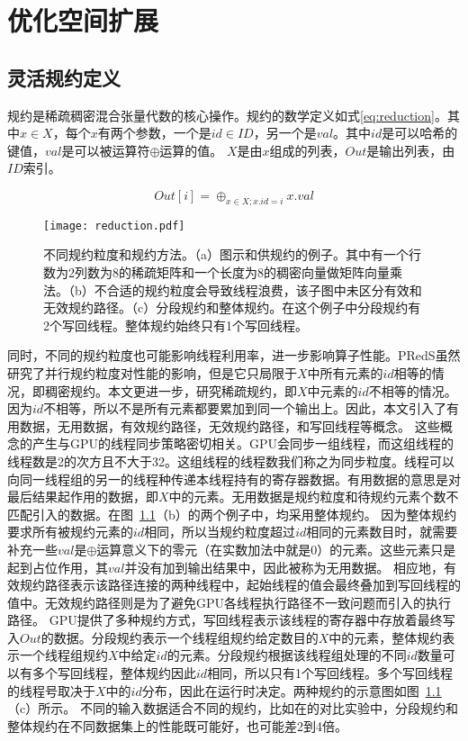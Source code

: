 
\chapter{优化空间扩展}

\section{灵活规约定义}\label{sec:flexible-reduciton}
规约是稀疏稠密混合张量代数的核心操作。规约的数学定义如式\eqref{eq:reduction}。其中$x \in X$，每个$x$有两个参数，一个是$id\in ID$，另一个是$val$。其中$id$是可以哈希的键值，$val$是可以被运算符$\oplus$运算的值。
$X$是由$x$组成的列表，$Out$是输出列表，由$ID$索引。

\begin{equation}
  Out[i] = \oplus_{x\in X;x.id=i} x.val
  \label{eq:reduction}
\end{equation}
\begin{figure}[h]%
  \centering
  \texttt{[image: reduction.pdf]}
  \caption{不同规约粒度和规约方法。（a）图示和供规约的例子。其中有一个行数为2列数为8的稀疏矩阵和一个长度为8的稠密向量做矩阵向量乘法。（b）不合适的规约粒度会导致线程浪费，该子图中未区分有效和无效规约路径。（c）分段规约和整体规约。在这个例子中分段规约有2个写回线程。整体规约始终只有1个写回线程。}
  \label{fig:reductions}
\end{figure}
同时，不同的规约粒度也可能影响线程利用率，进一步影响算子性能。PRedS\cite{yu2021exploiting}虽然研究了并行规约粒度对性能的影响，但是它只局限于$X$中所有元素的$id$相等的情况，即稠密规约。本文更进一步，研究稀疏规约，即$X$中元素的$id$不相等的情况。
因为$id$不相等，所以不是所有元素都要累加到同一个输出上。因此，本文引入了有用数据，无用数据，有效规约路径，无效规约路径，和写回线程等概念。
这些概念的产生与GPU的线程同步策略密切相关。GPU会同步一组线程，而这组线程的线程数是2的次方且不大于32。这组线程的线程数我们称之为同步粒度。线程可以向同一线程组的另一的线程种传递本线程持有的寄存器数据。有用数据的意思是对最后结果起作用的数据，即$X$中的元素。无用数据是规约粒度和待规约元素个数不匹配引入的数据。在图~\ref{fig:reductions}（b）的两个例子中，均采用整体规约。
因为整体规约要求所有被规约元素的$id$相同，所以当规约粒度超过$id$相同的元素数目时，就需要补充一些$val$是$\oplus$运算意义下的零元（在实数加法中就是0）的元素。这些元素只是起到占位作用，其$val$并没有加到输出结果中，因此被称为无用数据。
相应地，有效规约路径表示该路径连接的两种线程中，起始线程的值会最终叠加到写回线程的值中。无效规约路径则是为了避免GPU各线程执行路径不一致问题而引入的执行路径。
GPU提供了多种规约方式，写回线程表示该线程的寄存器中存放着最终写入$Out$的数据。分段规约表示一个线程组规约给定数目的$X$中的元素，整体规约表示一个线程组规约$X$中给定$id$的元素。分段规约根据该线程组处理的不同$id$数量可以有多个写回线程，整体规约因此$id$相同，所以只有1个写回线程。多个写回线程的线程号取决于$X$中的$id$分布，因此在运行时决定。两种规约的示意图如图~\ref{fig:reductions}（c）所示。
不同的输入数据适合不同的规约，比如在\cite{dai2022heuristic}的对比实验中，分段规约和整体规约在不同数据集上的性能既可能好，也可能差2到4倍。

